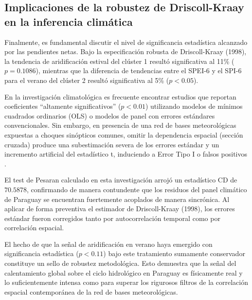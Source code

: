 \subsection{Implicaciones de la robustez de Driscoll-Kraay en la inferencia climática}

Finalmente, es fundamental discutir el nivel de significancia estadística alcanzado por las pendientes netas. Bajo la especificación robusta de Driscoll-Kraay (1998), la tendencia de aridificación estival del clúster 1 resultó significativa al 11\% ($p = 0.1086$), mientras que la diferencia de tendencias entre el SPEI-6 y el SPI-6 para el verano del clúster 2 resultó significativa al 5\% ($p < 0.05$).

En la investigación climatológica es frecuente encontrar estudios que reportan coeficientes ``altamente significativos'' ($p < 0.01$) utilizando modelos de mínimos cuadrados ordinarios (OLS) o modelos de panel con errores estándares convencionales. Sin embargo, en presencia de una red de bases meteorológicas expuestas a choques sinópticos comunes, omitir la dependencia espacial (sección cruzada) produce una subestimación severa de los errores estándar y un incremento artificial del estadístico t, induciendo a Error Tipo I o falsos positivos \cite{wooldridge2010}.

El test de Pesaran calculado en esta investigación arrojó un estadístico CD de $70.5878$, confirmando de manera contundente que los residuos del panel climático de Paraguay se encuentran fuertemente acoplados de manera sincrónica. Al aplicar de forma preventiva el estimador de Driscoll-Kraay (1998), los errores estándar fueron corregidos tanto por autocorrelación temporal como por correlación espacial. 

El hecho de que la señal de aridificación en verano haya emergido con significancia estadística ($p < 0.11$) bajo este tratamiento sumamente conservador constituye un sello de robustez metodológica. Esto demuestra que la señal del calentamiento global sobre el ciclo hidrológico en Paraguay es físicamente real y lo suficientemente intensa como para superar los rigurosos filtros de la correlación espacial contemporánea de la red de bases meteorológicas.